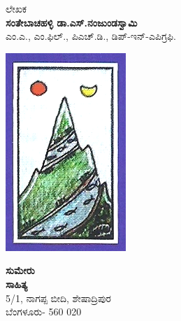 \thispagestyle{empty}


ಲೇಖಕ\\\textbf{ಸಂತೇಬಾಚಹಳ್ಳಿ ಡಾ.ಎಸ್​.ನಂಜುಂಡಸ್ವಾಮಿ}\\ ಎಂ.ಎ., ಎಂ.ಫಿಲ್​., ಪಿಎಚ್​.ಡಿ., ಡಿಪ್​-ಇನ್​-ಎಪಿಗ್ರಫಿ.

\includegraphics{images/logo.png}

\begin{center}
\textbf{ಸುಮೇರು}\\\textbf{ಸಾಹಿತ್ಯ}\\ 5/1, ನಾಗಪ್ಪ ಬೀದಿ, ಶೇಷಾದ್ರಿಪುರ\\ ಬೆಂಗಳೂರು- 560 020
\end{center}

